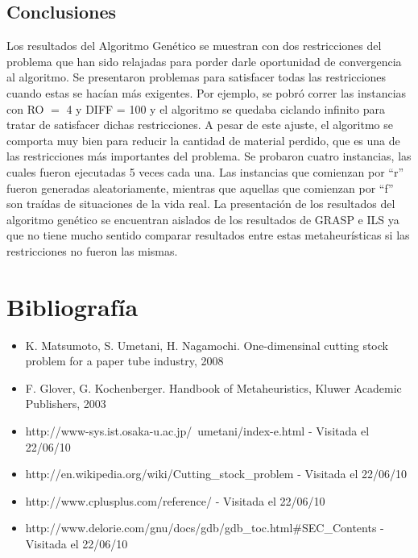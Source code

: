 \documentclass[letter,10pt]{article}
\begin{document}
\subsection{Conclusiones}

Los resultados del Algoritmo Genético se muestran con dos restricciones del problema que han sido relajadas para porder
darle oportunidad de convergencia al algoritmo. Se presentaron problemas para satisfacer todas las restricciones cuando 
estas se hacían más exigentes. Por ejemplo, se pobró correr las instancias con RO $=$ 4 y DIFF = 100 y el algoritmo se 
quedaba ciclando infinito para tratar de satisfacer dichas restricciones. A pesar de este ajuste, el algoritmo se comporta 
muy bien para reducir la cantidad de material perdido, que es una de las restricciones más importantes del problema. 
Se probaron cuatro instancias, las cuales fueron ejecutadas 5 veces cada una. Las instancias que comienzan por ``r'' fueron 
generadas aleatoriamente, mientras que aquellas que comienzan por ``f'' son traídas de situaciones de la vida real.
La presentación de los resultados del algoritmo genético se encuentran aislados de los resultados de GRASP e ILS ya que no 
tiene mucho sentido comparar resultados entre estas metaheurísticas si las restricciones no fueron las mismas. 

\newpage
\section{Bibliograf\'ia}
\begin{itemize}
 \item K. Matsumoto, S. Umetani, H. Nagamochi. One-dimensinal cutting stock problem for a paper tube industry, 2008
 \item F. Glover, G. Kochenberger. Handbook of Metaheuristics, Kluwer Academic Publishers, 2003
 \item http://www-sys.ist.osaka-u.ac.jp/~umetani/index-e.html - Visitada el 22/06/10
 \item http://en.wikipedia.org/wiki/Cutting\_stock\_problem - Visitada el 22/06/10
 \item http://www.cplusplus.com/reference/ - Visitada el 22/06/10
 \item http://www.delorie.com/gnu/docs/gdb/gdb\_toc.html\#SEC\_Contents - Visitada el 22/06/10
\end{itemize}
\end{document}
